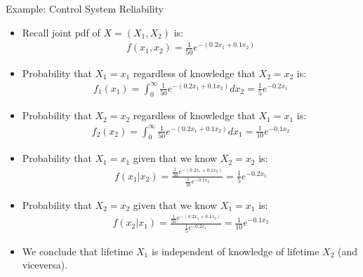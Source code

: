 \documentclass[9pt]{beamer}
\begin{document}
%
\begin{frame}{Example: Control System Reliability}

\begin{itemize}
\setlength{\itemsep}{5pt}
\item Recall joint pdf of $X=(X_1,X_2)$ is:
\begin{align*}
f(x_1,x_2)=\frac{1}{50}e^{-(0.2x_1+0.1x_2)}
\end{align*} 
\item Probability that $X_1=x_1$ regardless of knowledge that $X_2=x_2$ is:
\begin{align*}
f_1(x_1)=\int_{0}^{\infty}\frac{1}{50}e^{-(0.2x_1+0.1x_2)}dx_2=\frac{1}{5}e^{-0.2x_1}
\end{align*} 
\item Probability that $X_2=x_2$ regardless of knowledge that $X_1=x_1$ is:
\begin{align*}
f_2(x_2)=\int_{0}^{\infty}\frac{1}{50}e^{-(0.2x_1+0.1x_2)}dx_1=\frac{1}{10}e^{-0.1x_2}
\end{align*} 
\item Probability that $X_1=x_1$ given that we know $X_2=x_2$ is:
\begin{align*}
f(x_1|x_2)=\frac{\frac{1}{50}e^{-(0.2x_1+0.1x_2)}}{\frac{1}{10}e^{-0.1x_2}}=\frac{1}{5}e^{-0.2x_1}
\end{align*}
\item Probability that $X_2=x_2$ given that we know $X_1=x_1$ is:
\begin{align*}
f(x_2|x_1)=\frac{\frac{1}{50}e^{-(0.2x_1+0.1x_2)}}{\frac{1}{5}e^{-0.2x_1}}=\frac{1}{10}e^{-0.1x_2}
\end{align*}
\item We conclude that lifetime $X_1$ is independent of knowledge of lifetime $X_2$ (and viceversa). 
\end{itemize}

\end{frame}
\end{document}

